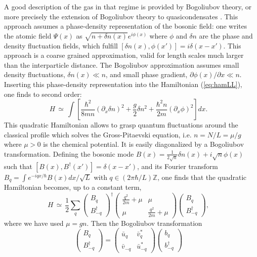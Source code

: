 \documentclass[onecolumn,amsfonts,showpacs,superscriptaddress]{revtex4-1}
\begin{document}
A good description of the gas in that regime is provided by Bogoliubov theory, or more precisely the extension of Bogoliubov theory to quasicondensates \citep{mora_extension_2003}. This approach assumes a phase-density representation of the bosonic field: one writes the atomic field $\Psi(x)$ as $\sqrt{n + \delta n(x)} e^{i \phi(x)}$ where $\phi$ and $\delta n$ are the phase and density fluctuation fields, which fulfill $[\delta n(x), \phi(x')] = i \delta(x-x')$. This approach is a coarse grained approximation, valid for length scales much larger than the interparticle distance. The Bogoliubov approximation assumes small density fluctuations, $\delta n(x) \ll n$, and small phase gradient, $\partial \phi(x)/\partial x \ll n $. Inserting this phase-density representation into the Hamiltonian (\ref{eq:hamLL}), one finds to second order:
\begin{equation}
    \label{eq:ham_quasicondensate}
  H \, \simeq \, \int \left[ \frac{\hbar^2}{8m n} (\partial_x \delta n)^2  + \frac{g}{2} \delta n^2 + \frac{\hbar^2 n}{2m} (\partial_x \phi)^2  \right] dx .
\end{equation}
This quadratic Hamiltonian allows to grasp quantum fluctuations around the classical profile which solves the Gross-Pitaevski equation, i.e. $n = N/L = \mu/g$ where $\mu>0$ is the chemical potential. It is easily diagonalized by a Bogoliubov transformation. Defining the bosonic mode $B(x) = \frac{1}{2 \sqrt{n}} \delta n(x) + i \sqrt{n} \phi(x)$ such that $[B(x) , B^\dagger(x')] = \delta(x-x')$, and its Fourier transform $B_q = \int e^{-i q x/\hbar} B(x) dx/\sqrt{L}$ with $q\in (2\pi \hbar/L) \mathbb{Z}$, one finds that the quadratic Hamiltonian becomes, up to a constant term,
\begin{equation}
 H \, \simeq \,  \frac{1}{2} \sum_q \left( \begin{array}{c} B_q \\B_{-q}^\dagger \end{array} \right)^\dagger \left( \begin{array}{cc}
    \frac{q^2}{2m} + \mu &  \mu  \\
   \mu & \frac{q^2}{2m} + \mu 
 \end{array} \right)  \left( \begin{array}{c} B_q \\B_{-q}^\dagger \end{array} \right)  ,
\end{equation}
where we have used $\mu = g n$. Then the Bogoliubov transformation
$$
\left( \begin{array}{c}
    B_q \\ B_{-q}^\dagger
\end{array} \right) = \left( \begin{array}{cc}
    \bar{u}_q & \bar{v}^*_{q} \\
    \bar{v}_{-q} & \bar{u}^*_{-q }
\end{array}\right) \left( \begin{array}{c}
    b_q \\ b_{-q}^\dagger
\end{array} \right)
$$
\end{document}
